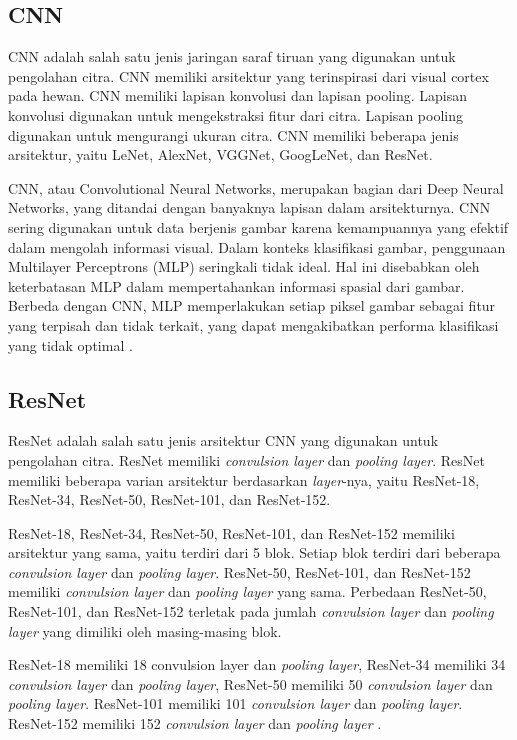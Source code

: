 \subsection{CNN}
\label{sec:223}

CNN adalah salah satu jenis jaringan saraf tiruan yang digunakan untuk pengolahan citra. CNN memiliki arsitektur yang terinspirasi dari visual cortex pada hewan. CNN memiliki lapisan konvolusi dan lapisan pooling. Lapisan konvolusi digunakan untuk mengekstraksi fitur dari citra. Lapisan pooling digunakan untuk mengurangi ukuran citra. CNN memiliki beberapa jenis arsitektur, yaitu LeNet, AlexNet, VGGNet, GoogLeNet, dan ResNet.

CNN, atau Convolutional Neural Networks, merupakan bagian dari Deep Neural Networks, yang ditandai dengan banyaknya lapisan dalam arsitekturnya. CNN sering digunakan untuk data berjenis gambar karena kemampuannya yang efektif dalam mengolah informasi visual. Dalam konteks klasifikasi gambar, penggunaan Multilayer Perceptrons (MLP) seringkali tidak ideal. Hal ini disebabkan oleh keterbatasan MLP dalam mempertahankan informasi spasial dari gambar. Berbeda dengan CNN, MLP memperlakukan setiap piksel gambar sebagai fitur yang terpisah dan tidak terkait, yang dapat mengakibatkan performa klasifikasi yang tidak optimal \parencite{AstutiSamsuryadi2018}.

\subsection{ResNet}
\label{sec:224}

ResNet adalah salah satu jenis arsitektur CNN yang digunakan untuk pengolahan citra. ResNet memiliki \emph{convulsion layer} dan \emph{pooling layer}. ResNet memiliki beberapa varian arsitektur berdasarkan \emph{layer}-nya, yaitu ResNet-18, ResNet-34, ResNet-50, ResNet-101, dan ResNet-152. 

ResNet-18, ResNet-34, ResNet-50, ResNet-101, dan ResNet-152 memiliki arsitektur yang sama, yaitu terdiri dari 5 blok. Setiap blok terdiri dari beberapa \emph{convulsion layer} dan \emph{pooling layer}. ResNet-50, ResNet-101, dan ResNet-152 memiliki \emph{convulsion layer} dan \emph{pooling layer} yang sama. Perbedaan ResNet-50, ResNet-101, dan ResNet-152 terletak pada jumlah \emph{convulsion layer} dan \emph{pooling layer} yang dimiliki oleh masing-masing blok.

ResNet-18 memiliki 18 convulsion layer dan \emph{pooling layer}, ResNet-34 memiliki 34 \emph{convulsion layer} dan \emph{pooling layer}, ResNet-50 memiliki 50 \emph{convulsion layer} dan \emph{pooling layer}. ResNet-101 memiliki 101 \emph{convulsion layer} dan \emph{pooling layer}. ResNet-152 memiliki 152 \emph{convulsion layer} dan \emph{pooling layer} \parencite{ResNet}.


